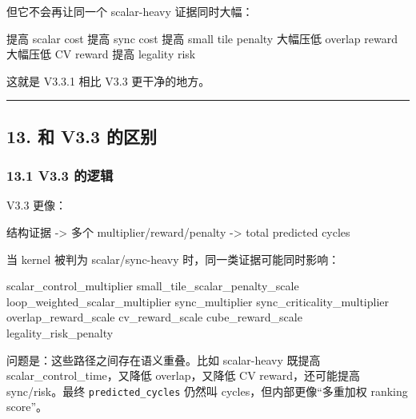 \documentclass[
  10pt,
]{article}
\newenvironment{Shaded}{}{}
\newcommand{\NormalTok}[1]{#1}
\begin{document}
但它不会再让同一个 scalar-heavy 证据同时大幅：

\begin{Shaded}
\begin{Highlighting}[]
\NormalTok{提高 scalar cost}
\NormalTok{提高 sync cost}
\NormalTok{提高 small tile penalty}
\NormalTok{大幅压低 overlap reward}
\NormalTok{大幅压低 CV reward}
\NormalTok{提高 legality risk}
\end{Highlighting}
\end{Shaded}

这就是 V3.3.1 相比 V3.3 更干净的地方。

\begin{center}\rule{0.5\linewidth}{0.5pt}\end{center}

\subsection{13. 和 V3.3 的区别}\label{ux548c-v3.3-ux7684ux533aux522b}

\subsubsection{13.1 V3.3 的逻辑}\label{v3.3-ux7684ux903bux8f91}

V3.3 更像：

\begin{Shaded}
\begin{Highlighting}[]
\NormalTok{结构证据 {-}\textgreater{} 多个 multiplier/reward/penalty {-}\textgreater{} total predicted cycles}
\end{Highlighting}
\end{Shaded}

当 kernel 被判为 scalar/sync-heavy 时，同一类证据可能同时影响：

\begin{Shaded}
\begin{Highlighting}[]
\NormalTok{scalar\_control\_multiplier}
\NormalTok{small\_tile\_scalar\_penalty\_scale}
\NormalTok{loop\_weighted\_scalar\_multiplier}
\NormalTok{sync\_multiplier}
\NormalTok{sync\_criticality\_multiplier}
\NormalTok{overlap\_reward\_scale}
\NormalTok{cv\_reward\_scale}
\NormalTok{cube\_reward\_scale}
\NormalTok{legality\_risk\_penalty}
\end{Highlighting}
\end{Shaded}

问题是：这些路径之间存在语义重叠。比如 scalar-heavy 既提高
scalar\_control\_time，又降低 overlap，又降低 CV reward，还可能提高
sync/risk。最终 \texttt{predicted\_cycles} 仍然叫
cycles，但内部更像``多重加权 ranking score''。
\end{document}
